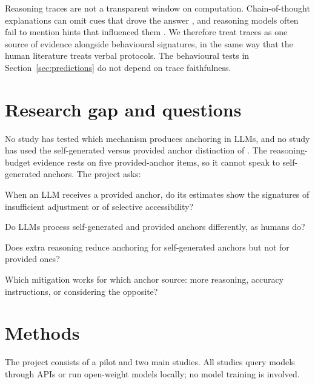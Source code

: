 \documentclass[11pt,a4paper]{article}
\newcommand{\RQ}[1]{\textbf{RQ#1}}
\begin{document}
Reasoning traces are not a transparent window on computation. Chain-of-thought explanations can omit cues that drove the answer \citep{turpin2023language}, and reasoning models often fail to mention hints that influenced them \citep{chen2025reasoning}. We therefore treat traces as one source of evidence alongside behavioural signatures, in the same way that the human literature treats verbal protocols. The behavioural tests in Section~\ref{sec:predictions} do not depend on trace faithfulness.

\section{Research gap and questions}

No study has tested which mechanism produces anchoring in LLMs, and no study has used the self-generated versus provided anchor distinction of \citet{epley2001putting}. The reasoning-budget evidence \citep{kraishan2026long} rests on five provided-anchor items, so it cannot speak to self-generated anchors. The project asks:

\begin{description}[leftmargin=1.2cm,labelwidth=1cm]
  \item[\RQ{1}] When an LLM receives a provided anchor, do its estimates show the signatures of insufficient adjustment or of selective accessibility?
  \item[\RQ{2}] Do LLMs process self-generated and provided anchors differently, as humans do?
  \item[\RQ{3}] Does extra reasoning reduce anchoring for self-generated anchors but not for provided ones?
  \item[\RQ{4}] Which mitigation works for which anchor source: more reasoning, accuracy instructions, or considering the opposite?
\end{description}

\section{Methods}

The project consists of a pilot and two main studies. All studies query models through APIs or run open-weight models locally; no model training is involved.
\end{document}
